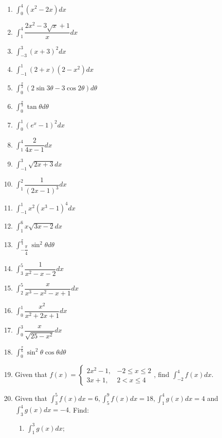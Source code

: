 \documentclass{report}
\begin{document}
\begin{enumerate}
    \item $\displaystyle\int_0^4\left(x^2-2 x\right) d x$
    \item $\displaystyle\int_1^4 \dfrac{2 x^2-3 \sqrt{x}+1}{x} d x$
    \item $\displaystyle\int_{-3}^3(x+3)^2 d x$
    \item $\displaystyle\int_{-1}^1(2+x)\left(2-x^2\right) d x$
    \item $\displaystyle\int_0^{\frac{\pi}{2}}(2 \sin 3 \theta-3 \cos 2 \theta) d \theta$
    \item $\displaystyle\int_0^{\frac{\pi}{3}} \tan \theta d \theta$
    \item $\displaystyle\int_0^1\left(e^x-1\right)^2 d x$
    \item $\displaystyle\int_1^4 \dfrac{2}{4 x-1} d x$
    \item $\displaystyle\int_{-1}^3 \sqrt{2 x+3} d x$
    \item $\displaystyle\int_1^2 \dfrac{1}{(2 x-1)^3} d x$
    \item $\displaystyle\int_{-1}^1 x^2\left(x^3-1\right)^4 d x$
    \item $\displaystyle\int_1^6 x \sqrt{3 x-2} d x$
    \item $\displaystyle\int_{-\dfrac{\pi}{4}}^{\frac{\pi}{4}} \sin ^2 \theta d \theta$
    \item $\displaystyle\int_3^5 \dfrac{1}{x^2-x-2} d x$
    \item $\displaystyle\int_2^5 \dfrac{x}{x^3-x^2-x+1} d x$
    \item $\displaystyle\int_0^1 \dfrac{x^2}{x^2+2 x+1} d x$
    \item $\displaystyle\int_0^3 \dfrac{x}{\sqrt{25-x^2}} d x$
    \item $\displaystyle\int_0^{\frac{\pi}{6}} \sin ^2 \theta \cos \theta d \theta$
    \item Given that $f(x)=\left\{\begin{array}{cc}2 x^2-1, & -2 \leq x \leq 2 \\ 3 x+1, & 2<x \leq 4\end{array}\right.$, find $\displaystyle\int_{-2}^4 f(x) d x$.
    \item Given that $\displaystyle\int_3^5 f(x) d x=6, \int_5^9 f(x) d x=18, \int_1^4
              g(x) d x=4$ and $\displaystyle\int_3^4 g(x) d x=-4$. Find:
          \begin{enumerate}
              \item $\displaystyle\int_1^3 g(x) d x$;

\end{enumerate}
\end{enumerate}
\end{document}

